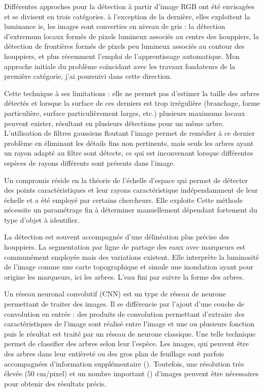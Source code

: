 \documentclass{article}
\begin{document}
Différentes approches pour la détection à partir d'image RGB ont été envisagées et se divisent en trois catégories. à l'exception de la dernière, elles exploitent la luminance ie, les images sont converties en niveau de gris : la détection d'extremum locaux formés de pixels lumineux associés au centre des houppiers, la détection de frontières formés de pixels peu lumineux associés au contour des houppiers, et plus récemment l'emploi de l'apprentissage automatique. Mon approche initiale du problème coïncidant avec les travaux fondateurs de la première catégorie, j'ai poursuivi dans cette direction. 

Cette technique à ses limitations : elle ne permet pas d'estimer la taille des arbres détectés et lorsque la surface de ces derniers est trop irrégulière (branchage, forme particulière, surface particulièrement larges, etc.) plusieurs maximums locaux peuvent exister, résultant en plusieurs détections pour un même arbre. L'utilisation de filtres gaussiens floutant l'image permet de remédier à ce dernier problème en éliminant les détails fins non pertinents, mais seuls les arbres ayant un rayon adapté au filtre sont détecte, ce qui est inconvenant lorsque différentes espèces de rayons différents sont présents dans l'image. 

Un compromis réside en la théorie de l'échelle d'espace qui permet de détecter des points caractéristiques et leur rayons caractéristique indépendamment de leur échelle et a été employé par certains chercheurs. Elle exploite  Cette méthode nécessite un paramétrage fin à déterminer manuellement dépendant fortement du type d'objet à identifier.

La détection est souvent accompagnée d'une délinéation plus précise des houppiers. La segmentation par ligne de partage des eaux avec marqueurs est communément employée mais des variations existent. Elle interprète la luminosité de l'image comme une carte topographique et simule une inondation ayant pour origine les marqueurs, ici les arbres. L'eau fini par suivre la forme des arbres.

Un réseau neuronal convolutif (CNN) est un type de réseau de neurone permettant de traiter des images. Il se différencie par l'ajout d'une couche de convolution en entrée : des produits de convolution permettant d'extraire des caractéristiques de l'image sont réalisé entre l'image et une ou plusieurs fonction puis le résultat est traité par un réseau de neurone classique. Une telle technique permet de classifier des arbres selon leur l'espèce. Les images, qui peuvent être des arbres dans leur entièreté ou des gros plan de feuillage sont parfois accompagnées d'information supplémentaire (). Toutefois, une résolution très élevée (50 cm/pixel) et un nombre important () d'images peuvent être nécessaires pour obtenir des résultats précis.
\end{document}
